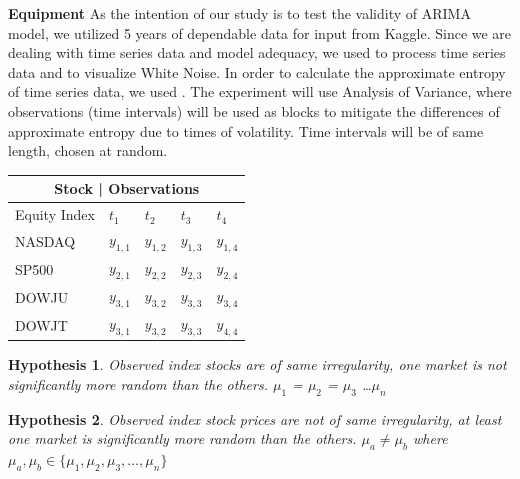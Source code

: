 \documentclass{article}[12pt]
\newtheorem*{hyp*}{Hypothesis \protect\hypnumber} %
\newenvironment{hyp}[1]{\renewcommand{\hypnumber}{#1}\begin{hyp*}}{\end{hyp*}}
\newcommand{\hypnumber}{}
\begin{document}
        \textbf{Equipment}
        As the intention of our study is to test the validity of ARIMA model, we utilized 5 years of dependable data for input from Kaggle. Since we are dealing with time series data and model adequacy, we used  to process time series data and  to visualize White Noise. In order to calculate the approximate entropy of time series data, we used . The experiment will use Analysis of Variance, where observations (time intervals) will be used as blocks to mitigate the differences of approximate entropy due to times of volatility. Time intervals will be of same length, chosen at random.

        \medskip
            \begin{center}
                \begin{tabular}{ |p{2cm}||p{2cm}|p{2cm}|p{2cm}|p{2cm}|}
                    \hline
                    \multicolumn{5}{|c|}{Stock | Observations} \\
                    \hline
                    Equity Index&$t_{1}$      &$t_{2}$    &$t_{3}$    &$t_{4}$    \\
                    \hline
                    NASDAQ      &$y_{1,1}$   &$y_{1,2}$  &$y_{1,3}$  &$y_{1,4}$  \\
                    SP500       &$y_{2,1}$   &$y_{2,2}$  &$y_{2,3}$  &$y_{2,4}$  \\
                    DOWJU       &$y_{3,1}$   &$y_{3,2}$  &$y_{3,3}$  &$y_{3,4}$  \\
                    DOWJT       &$y_{3,1}$   &$y_{3,2}$  &$y_{3,3}$  &$y_{4,4}$  \\
                    \hline
                \end{tabular}
        \end{center}

            \begin{hyp}{0} 
                Observed index stocks are of same irregularity, one market is not significantly more random than the others.
                $\mu_{1}$ = $\mu_{2}$ = $\mu_{3}$ \dots $\mu_{n}$  
            \end{hyp}
            \begin{hyp}{1} 
                Observed index stock prices are not of same irregularity, at least one market is significantly more random than the others.
                $\mu_{a} \neq \mu_{b}$ where \( \mu_{a},\mu_{b} \in \{\mu_{1}, \mu_{2},\mu_{3}, \dots, \mu_{n} \} \)
            \end{hyp}
            \medskip
\end{document}
